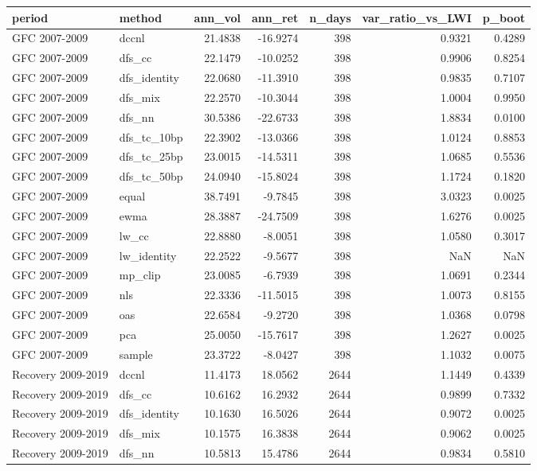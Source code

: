 \begin{tabular}{llrrrrr}
\toprule
period & method & ann_vol & ann_ret & n_days & var_ratio_vs_LWI & p_boot \\
\midrule
GFC 2007-2009 & dccnl & 21.4838 & -16.9274 & 398 & 0.9321 & 0.4289 \\
GFC 2007-2009 & dfs_cc & 22.1479 & -10.0252 & 398 & 0.9906 & 0.8254 \\
GFC 2007-2009 & dfs_identity & 22.0680 & -11.3910 & 398 & 0.9835 & 0.7107 \\
GFC 2007-2009 & dfs_mix & 22.2570 & -10.3044 & 398 & 1.0004 & 0.9950 \\
GFC 2007-2009 & dfs_nn & 30.5386 & -22.6733 & 398 & 1.8834 & 0.0100 \\
GFC 2007-2009 & dfs_tc_10bp & 22.3902 & -13.0366 & 398 & 1.0124 & 0.8853 \\
GFC 2007-2009 & dfs_tc_25bp & 23.0015 & -14.5311 & 398 & 1.0685 & 0.5536 \\
GFC 2007-2009 & dfs_tc_50bp & 24.0940 & -15.8024 & 398 & 1.1724 & 0.1820 \\
GFC 2007-2009 & equal & 38.7491 & -9.7845 & 398 & 3.0323 & 0.0025 \\
GFC 2007-2009 & ewma & 28.3887 & -24.7509 & 398 & 1.6276 & 0.0025 \\
GFC 2007-2009 & lw_cc & 22.8880 & -8.0051 & 398 & 1.0580 & 0.3017 \\
GFC 2007-2009 & lw_identity & 22.2522 & -9.5677 & 398 & NaN & NaN \\
GFC 2007-2009 & mp_clip & 23.0085 & -6.7939 & 398 & 1.0691 & 0.2344 \\
GFC 2007-2009 & nls & 22.3336 & -11.5015 & 398 & 1.0073 & 0.8155 \\
GFC 2007-2009 & oas & 22.6584 & -9.2720 & 398 & 1.0368 & 0.0798 \\
GFC 2007-2009 & pca & 25.0050 & -15.7617 & 398 & 1.2627 & 0.0025 \\
GFC 2007-2009 & sample & 23.3722 & -8.0427 & 398 & 1.1032 & 0.0075 \\
Recovery 2009-2019 & dccnl & 11.4173 & 18.0562 & 2644 & 1.1449 & 0.4339 \\
Recovery 2009-2019 & dfs_cc & 10.6162 & 16.2932 & 2644 & 0.9899 & 0.7332 \\
Recovery 2009-2019 & dfs_identity & 10.1630 & 16.5026 & 2644 & 0.9072 & 0.0025 \\
Recovery 2009-2019 & dfs_mix & 10.1575 & 16.3838 & 2644 & 0.9062 & 0.0025 \\
Recovery 2009-2019 & dfs_nn & 10.5813 & 15.4786 & 2644 & 0.9834 & 0.5810 \\

\end{tabular}
